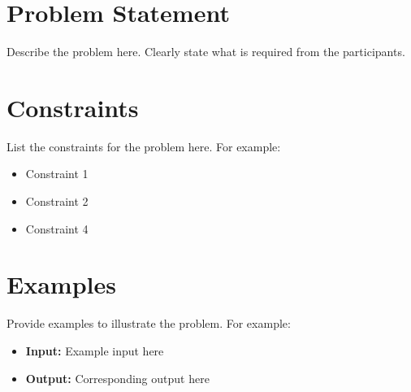 \section*{Problem Statement}
Describe the problem here. Clearly state what is required from the participants.

\section*{Constraints}
List the constraints for the problem here. For example:
\begin{itemize}
    \item Constraint 1
    \item Constraint 2
    \item Constraint 4
\end{itemize}

\section*{Examples}
Provide examples to illustrate the problem. For example:
\begin{itemize}
    \item \textbf{Input:} Example input here
    \item \textbf{Output:} Corresponding output here
\end{itemize}